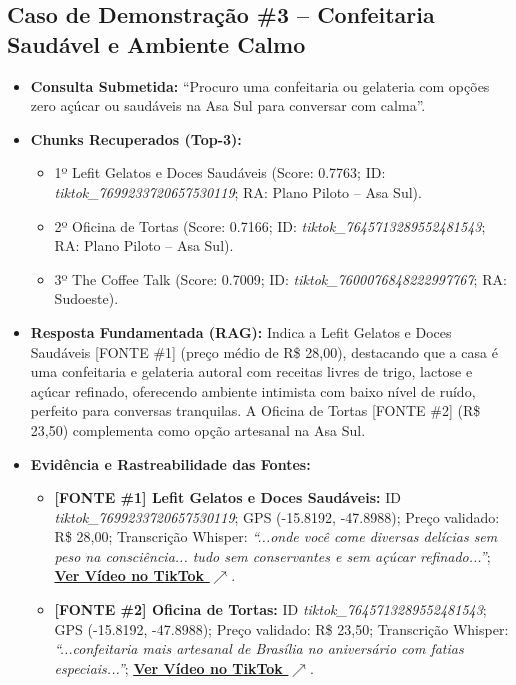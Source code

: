 \documentclass[11pt,a4paper]{article}
\begin{document}
\subsection{Caso de Demonstração \#3 -- Confeitaria Saudável e Ambiente Calmo}
\begin{itemize}[leftmargin=1.0cm]
\item \textbf{Consulta Submetida:} ``Procuro uma confeitaria ou gelateria com opções zero açúcar ou saudáveis na Asa Sul para conversar com calma''.
\item \textbf{Chunks Recuperados (Top-3):}
\begin{itemize}
\item 1º Lefit Gelatos e Doces Saudáveis (Score: 0.7763; ID: \textit{tiktok\_7699233720657530119}; RA: Plano Piloto -- Asa Sul).
\item 2º Oficina de Tortas (Score: 0.7166; ID: \textit{tiktok\_7645713289552481543}; RA: Plano Piloto -- Asa Sul).
\item 3º The Coffee Talk (Score: 0.7009; ID: \textit{tiktok\_7600076848222997767}; RA: Sudoeste).
\end{itemize}
\item \textbf{Resposta Fundamentada (RAG):} Indica a Lefit Gelatos e Doces Saudáveis [FONTE \#1] (preço médio de R\$ 28,00), destacando que a casa é uma confeitaria e gelateria autoral com receitas livres de trigo, lactose e açúcar refinado, oferecendo ambiente intimista com baixo nível de ruído, perfeito para conversas tranquilas. A Oficina de Tortas [FONTE \#2] (R\$ 23,50) complementa como opção artesanal na Asa Sul.
\item \textbf{Evidência e Rastreabilidade das Fontes:}
\begin{itemize}
\item \textbf{[FONTE \#1] Lefit Gelatos e Doces Saudáveis:} ID \textit{tiktok\_7699233720657530119}; GPS (-15.8192, -47.8988); Preço validado: R\$ 28,00; Transcrição Whisper: \textit{``...onde você come diversas delícias sem peso na consciência... tudo sem conservantes e sem açúcar refinado...''}; \href{https://www.tiktok.com/@rolezandoembrasilia/video/7699233720657530119}{\textbf{\underline{Ver Vídeo no TikTok $\nearrow$}}}.
\item \textbf{[FONTE \#2] Oficina de Tortas:} ID \textit{tiktok\_7645713289552481543}; GPS (-15.8192, -47.8988); Preço validado: R\$ 23,50; Transcrição Whisper: \textit{``...confeitaria mais artesanal de Brasília no aniversário com fatias especiais...''}; \href{https://www.tiktok.com/@rolezandoembrasilia/video/7645713289552481543}{\textbf{\underline{Ver Vídeo no TikTok $\nearrow$}}}.
\end{itemize}
\end{itemize}
\end{document}
